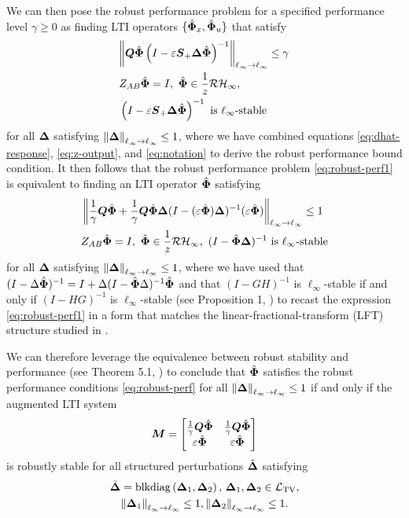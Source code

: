 We can then pose the robust performance problem for a specified performance level $\gamma \geq 0$ as finding LTI operators $\{\hat{\boldsymbol{\Phi}}_x,\hat{\boldsymbol{\Phi}}_u\}$ that satisfy 
\begin{equation}\label{eq:robust-perf1}
\begin{aligned}
&{ \left\lVert \boldsymbol{Q}\hat{\boldsymbol{\Phi}} \left(I-\varepsilon\boldsymbol{S}_+{\boldsymbol{\Delta}}\hat{\boldsymbol{\Phi}}\right)^{-1}  \right\rVert_{\ell_\infty \to \ell_\infty}} \leq \gamma \\
&Z_{AB}\hat{\boldsymbol{\Phi}} = I,\ \hat{\boldsymbol{\Phi}} \in \frac{1}{z}\mathcal{RH}_\infty, \\
& \left(I-\varepsilon\boldsymbol{S}_+{\boldsymbol{\Delta}}\hat{\boldsymbol{\Phi}}\right)^{-1} \text{ is $\ell_\infty$-stable}
\end{aligned}
\end{equation}
for all ${\boldsymbol{\Delta}}$ satisfying $\left\|{\boldsymbol{\Delta}}\right\|_{\ell_\infty\to\ell_\infty}\leq 1$, where we have combined equations  \eqref{eq:dhat-response}, \eqref{eq:z-output}, and \eqref{eq:notation} to derive the robust performance bound condition.  It then follows that the robust performance problem \eqref{eq:robust-perf1} is equivalent to finding an LTI operator $\hat{\boldsymbol{\Phi}}$ satisfying
\begin{equation} \label{eq:robust-perf}
\begin{aligned}
& \left\|\frac{1}{\gamma}\boldsymbol{Q}\hat{\boldsymbol{\Phi}} + \frac{1}{\gamma}\boldsymbol{Q}\hat{\boldsymbol{\Phi}}{\boldsymbol{\Delta}}(I-(\varepsilon\hat{\boldsymbol{\Phi}}){\boldsymbol{\Delta}})^{-1}(\varepsilon\hat{\boldsymbol{\Phi}})\right\|_{\ell_\infty\to\ell_\infty} \leq 1 \\
& Z_{AB}\hat{\boldsymbol{\Phi}} = I,\ \hat{\boldsymbol{\Phi}} \in \frac{1}{z}\mathcal{RH}_\infty,\   (I-\hat{\boldsymbol{\Phi}}{\boldsymbol{\Delta}})^{-1} \text{ is $\ell_\infty$-stable}\\
\end{aligned}
\end{equation}
for all ${\boldsymbol{\Delta}}$ satisfying $\left\|{\boldsymbol{\Delta}}\right\|_{\ell_\infty\to\ell_\infty}\leq 1$, where we have used that $(I-\Delta\hat{\boldsymbol{\Phi}})^{-1} = I + \Delta(I-\hat{\boldsymbol{\Phi}}\Delta)^{-1}\hat{\boldsymbol{\Phi}}$ and that $(I-GH)^{-1}$ is $\ell_\infty$-stable if and only if $(I-HG)^{-1}$ is $\ell_\infty$-stable (see Proposition 1, \cite{khammash1990stability}) to recast the expression \eqref{eq:robust-perf1} in a form that matches the linear-fractional-transform (LFT) structure studied in \cite{khammash1990stability,dahleh1994control}.

We can therefore leverage the equivalence between robust stability and performance (see Theorem 5.1, \cite{khammash1990stability}) to conclude that $\hat{\boldsymbol{\Phi}}$ satisfies the robust performance conditions \eqref{eq:robust-perf} for all $\left\|{\boldsymbol{\Delta}}\right\|_{\ell_\infty\to\ell_\infty}\leq 1$ if and only if the augmented LTI system
\begin{equation}
\tf M = \begin{bmatrix} \frac{1}{\gamma}\Q\Phih & \frac{1}{\gamma}\Q\Phih \\ \eps\Phih & \eps\Phih \end{bmatrix}
\label{eq:bigM}
\end{equation}
is robustly stable for all structured perturbations $\tilde{{\boldsymbol{\Delta}}}$ satisfying
\begin{multline}
\tilde{{\boldsymbol{\Delta}}} = \mathrm{blkdiag}\left({\boldsymbol{\Delta}}_1,{\boldsymbol{\Delta}}_2\right), \, {\boldsymbol{\Delta}}_1, {\boldsymbol{\Delta}}_2 \in \mathcal{L}_{\mathrm{TV}}, \\ \left\|{\boldsymbol{\Delta}}_1\right\|_{\ell_\infty\to\ell_\infty} \leq 1, \left\|{\boldsymbol{\Delta}}_2\right\|_{\ell_\infty\to\ell_\infty} \leq 1.
\end{multline}

